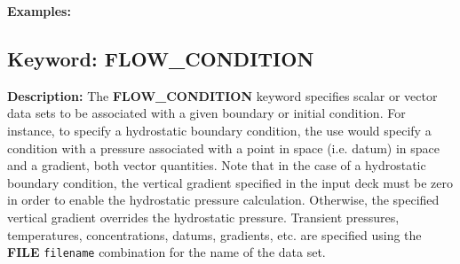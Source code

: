 \documentclass[12pt]{article}
\begin{document}
\bigskip

{\noindent\bf Examples:}


\newpage
\protect\hypertarget{target_flow_cond}{}

\subsection{Keyword: FLOW\_CONDITION}

{\noindent\bf Description:}
The {\bf FLOW\_CONDITION} keyword specifies scalar or vector data sets to be associated with a given boundary or initial condition.  For instance, to specify a hydrostatic boundary condition, the use would specify a condition with a pressure associated with a point in space (i.e. datum) in space and a gradient, both vector quantities.  Note that in the case of a hydrostatic boundary condition, the vertical gradient specified in the input deck must be zero in order to enable the hydrostatic pressure calculation.  Otherwise, the specified vertical gradient overrides the hydrostatic pressure.  Transient pressures, temperatures, concentrations, datums, gradients, etc. are specified using the {\bf FILE} {\tt filename} combination for the name of the data set.
\end{document}
